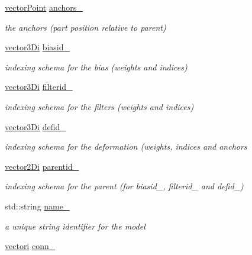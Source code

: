 \begin{DoxyCompactItemize}
\hyperlink{types_8hpp_ac468fcf6870d6563ac8fa3669845afcc}{vector\-Point} \hyperlink{classModel_ac2aa3eb0450ac05d0a3c7274b4ad91eb}{anchors\-\_\-}
\begin{DoxyCompactList}\small\item\em the anchors (part position relative to parent) \end{DoxyCompactList}\item 
\hyperlink{types_8hpp_a1f7c8ad00a53fb2d61b3656da9a6581d}{vector3\-Di} \hyperlink{classModel_a7c3905dd5e45a2e60da02c783a49db9c}{biasid\-\_\-}
\begin{DoxyCompactList}\small\item\em indexing schema for the bias (weights and indices) \end{DoxyCompactList}\item 
\hyperlink{types_8hpp_a1f7c8ad00a53fb2d61b3656da9a6581d}{vector3\-Di} \hyperlink{classModel_a08e65111230ab010535cc9485dfd6d0d}{filterid\-\_\-}
\begin{DoxyCompactList}\small\item\em indexing schema for the filters (weights and indices) \end{DoxyCompactList}\item 
\hyperlink{types_8hpp_a1f7c8ad00a53fb2d61b3656da9a6581d}{vector3\-Di} \hyperlink{classModel_a381f13c9035313ffd1cb67e07a2e84bd}{defid\-\_\-}
\begin{DoxyCompactList}\small\item\em indexing schema for the deformation (weights, indices and anchors \end{DoxyCompactList}\item 
\hyperlink{types_8hpp_a93a5e2cfd40d1ff1f10d8bbf11884c41}{vector2\-Di} \hyperlink{classModel_a4e1151fe7911f52ec75944eff1b257f4}{parentid\-\_\-}
\begin{DoxyCompactList}\small\item\em indexing schema for the parent (for biasid\-\_\-, filterid\-\_\- and defid\-\_\-) \end{DoxyCompactList}\item 
std\-::string \hyperlink{classModel_afca3bde5ad33e936c455d3d311b8406d}{name\-\_\-}
\begin{DoxyCompactList}\small\item\em a unique string identifier for the model \end{DoxyCompactList}\item 
\hyperlink{types_8hpp_a44529587d60e73bf0e689a82e5e70a55}{vectori} \hyperlink{classModel_a976b10b7048b41203eae19c141654abf}{conn\-\_\-}

\end{DoxyCompactItemize}
